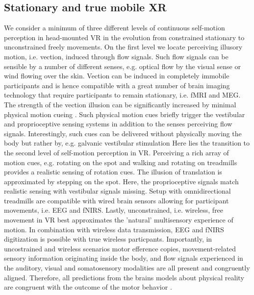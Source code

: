\subsection{Stationary and true mobile XR}
We consider a minimum of three different levels of continuous self-motion perception in head-mounted VR in the evolution from constrained stationary to unconstrained freely movements. On the first level we locate perceiving illusory motion, i.e. vection, induced through flow signals. Such flow signals can be sensible by a number of different senses, e.g. optical flow by the visual sense or wind flowing over the skin. Vection can be induced in completely immobile participants and is hence compatible with a great number of brain imaging technology that require participants to remain stationary, i.e. fMRI and MEG. The strength of the vection illusion can be significantly increased by minimal physical motion cueing \cite{}. %
Such physical motion cues briefly trigger the vestibular and proprioceptive sensing systems in addition to the senses perceiving flow signals. Interestingly, such cues can be delivered without physically moving the body but rather by, e.g. galvanic vestibular stimulation \cite{} %
Here lies the transition to the second level of self-motion perception in VR. Perceiving a rich array of motion cues, e.g. rotating on the spot and walking and rotating on treadmills provides a realistic sensing of rotation cues. The illusion of translation is approximated by stepping on the spot. Here, the proprioceptive signals match realistic sensing with vestibular signals missing. Setup with omnidirectional treadmills are compatible with wired brain sensors allowing for participant movements, i.e. EEG and fNIRS. %
Lastly, unconstrained, i.e. wireless, free movement in VR best approximates the 'natural' multisensory experience of motion. In combination with wireless data transmission, EEG and fNIRS digitization is possible with true wireless particpants. Importantly, in uncostrained and wireless scenarios motor efference copies, movement-related sensory information originating inside the body, and flow signals experienced in the auditory, visual and somatosensory modalities are all present and congruently aligned. Therefore, all predictions from the brains models about physical reality are congruent with the outcome of the motor behavior \cite{}. %

